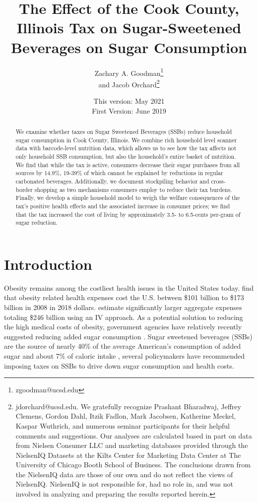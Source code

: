 \documentclass[12pt]{article}
\title{The Effect of the Cook County, Illinois Tax on Sugar-Sweetened Beverages on Sugar Consumption}
\author{Zachary A. Goodman\thanks{zgoodman@ucsd.edu}\\ and Jacob Orchard\thanks{jdorchard@ucsd.edu. We gratefully recognize Prashant Bharadwaj, Jeffrey Clemens, Gordon Dahl, Itzik Fadlon, Mark Jacobsen, Katherine Meckel, Kaspar Wuthrich, and numerous seminar participants for their helpful comments and suggestions. Our analyses are calculated based in part on data from Nielsen Consumer LLC and marketing databases provided through the NielsenIQ Datasets at the Kilts Center for Marketing Data Center at The University of Chicago Booth School of Business. The conclusions drawn from the NielsenIQ data are those of our own and do not reflect the views of NielsenIQ. NielsenIQ is not responsible for, had no role in, and was not involved in analyzing and preparing the results reported herein.}}
\affil{University of California, San Diego}
\date{This version: May 2021\\
First Version: June 2019}
\begin{document}
\maketitle

\begin{abstract}

We examine whether taxes on Sugar Sweetened Beverages (SSBs) reduce household sugar consumption in Cook County, Illinois. We combine rich household level scanner data with barcode-level nutrition data, which allows us to see how the tax affects not only household SSB consumption, but also the household's entire basket of nutrition. We find that while the tax is active, consumers decrease their sugar purchases from all sources by 14.9\%, 19-39\% of which cannot be explained by reductions in regular carbonated beverages. Additionally, we document stockpiling behavior and cross-border shopping as two mechanisms consumers employ to reduce their tax burdens.  Finally, we develop a simple household model to weigh the welfare consequences of the tax's positive health effects and the associated increase in consumer prices; we find that the tax increased the cost of living by approximately 3.5- to 6.5-cents per-gram of sugar reduction.
\end{abstract}

\pagebreak

\newpage

\section{Introduction} \label{introduction}

Obesity remains among the costliest health issues in the United States today. \textcite{finkelstein2009annual} find that obesity related health expenses cost the U.S. between \$101 billion to \$173 billion in 2008 in 2018 dollars. \textcite{cawley2012medical} estimate significantly larger aggregate expenses totaling \$246 billion using an IV approach.  As a potential solution to reducing the high medical costs of obesity, government agencies have relatively recently suggested reducing added sugar consumption \parencite{dietary2015dietary}. Sugar sweetened beverages (SSBs) are the source of nearly 40\% of the average American's consumption of added sugar \parencite{dietary2015dietary} and about 7\% of caloric intake \parencite{allcott2019should}, several policymakers have recommended imposing taxes on SSBs to drive down sugar consumption and health costs.
\end{document}
